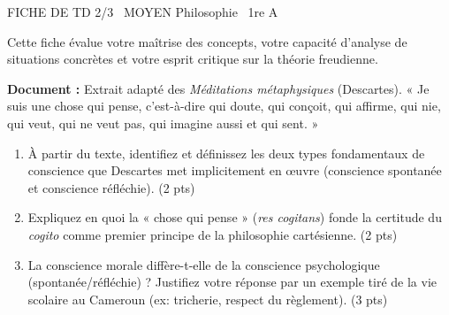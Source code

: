 \documentclass[11pt]{article}
\begin{document}
\begin{tcolorbox}[enhanced,colback=popink,colframe=popink,arc=10pt,boxrule=0pt,left=12pt,right=12pt,top=9pt,bottom=9pt]
{\color{white}\popxbold\small FICHE DE TD 2/3 \textbullet\ MOYEN \hfill Philosophie \textbullet\ 1re A\par}
\end{tcolorbox}
\vspace{4pt}
Cette fiche évalue votre maîtrise des concepts, votre capacité d'analyse de situations concrètes et votre esprit critique sur la théorie freudienne.

\begin{exercice}
\textbf{Document :} Extrait adapté des \textit{Méditations métaphysiques} (Descartes). « Je suis une chose qui pense, c'est-à-dire qui doute, qui conçoit, qui affirme, qui nie, qui veut, qui ne veut pas, qui imagine aussi et qui sent. »

\begin{enumerate}
    \item À partir du texte, identifiez et définissez les deux types fondamentaux de conscience que Descartes met implicitement en œuvre (conscience spontanée et conscience réfléchie). (2 pts)
    \item Expliquez en quoi la « chose qui pense » (\textit{res cogitans}) fonde la certitude du \textit{cogito} comme premier principe de la philosophie cartésienne. (2 pts)
    \item La conscience morale diffère-t-elle de la conscience psychologique (spontanée/réfléchie) ? Justifiez votre réponse par un exemple tiré de la vie scolaire au Cameroun (ex: tricherie, respect du règlement). (3 pts)
\end{enumerate}
\end{exercice}
\end{document}
